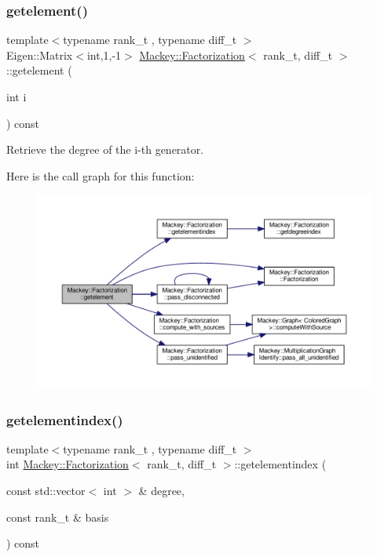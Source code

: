 \subsubsection{\texorpdfstring{getelement()}{getelement()}}
{\footnotesize\ttfamily template$<$typename rank\+\_\+t , typename diff\+\_\+t $>$ \\
Eigen\+::\+Matrix$<$int,1,-\/1$>$ \hyperlink{classMackey_1_1Factorization}{Mackey\+::\+Factorization}$<$ rank\+\_\+t, diff\+\_\+t $>$\+::getelement (\begin{DoxyParamCaption}\item[{int}]{i }\end{DoxyParamCaption}) const\hspace{0.3cm}{\ttfamily [inline]}}



Retrieve the degree of the i-\/th generator. 

Here is the call graph for this function\+:\nopagebreak
\begin{figure}[H]
\begin{center}
\leavevmode
\includegraphics[width=350pt]{classMackey_1_1Factorization_a6e15f1fb3623685326255f7badf7eee9_cgraph}
\end{center}
\end{figure}
\mbox{\label{classMackey_1_1Factorization_a5217ad8ca4aaa13b900adda77893249b}} 
\subsubsection{\texorpdfstring{getelementindex()}{getelementindex()}}
{\footnotesize\ttfamily template$<$typename rank\+\_\+t , typename diff\+\_\+t $>$ \\
int \hyperlink{classMackey_1_1Factorization}{Mackey\+::\+Factorization}$<$ rank\+\_\+t, diff\+\_\+t $>$\+::getelementindex (\begin{DoxyParamCaption}\item[{const std\+::vector$<$ int $>$ \&}]{degree,  }\item[{const rank\+\_\+t \&}]{basis }\end{DoxyParamCaption}) const\hspace{0.3cm}{\ttfamily [inline]}}




